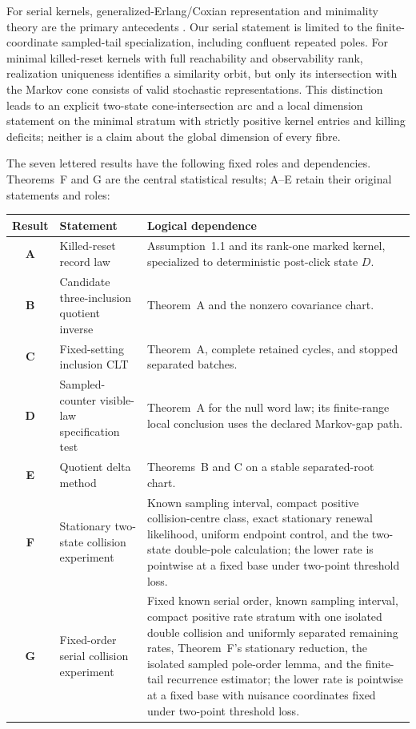 For serial kernels, generalized-Erlang/Coxian representation and minimality
theory are the primary antecedents \cite{HeZhang2008MinimalCoxian,
HeZhang2009GeneralizedErlang}.  Our serial statement is limited to the
finite-coordinate sampled-tail specialization, including confluent repeated
poles.  For minimal killed-reset kernels with full reachability and
observability rank, realization uniqueness identifies a similarity orbit, but
only its intersection with the Markov cone consists of valid stochastic
representations.  This distinction leads to an explicit
two-state cone-intersection arc and a local dimension statement on the minimal
stratum with strictly positive kernel entries and killing deficits; neither is
a claim about the global dimension of every fibre.

The seven lettered results have the following fixed roles and dependencies.
Theorems~F and G are the central statistical results; A--E retain their
original statements and roles:
\begin{center}
\begin{tabular}{>{\bfseries}c p{} p{}}
\toprule
Result & Statement & Logical dependence \\
\midrule
A & Killed-reset record law & Assumption~1.1 and its rank-one marked kernel, specialized to deterministic post-click state \(D\). \\
B & Candidate three-inclusion quotient inverse & Theorem~A and the nonzero covariance chart. \\
C & Fixed-setting inclusion CLT & Theorem~A, complete retained cycles, and stopped separated batches. \\
D & Sampled-counter visible-law specification test & Theorem~A for the null word law; its finite-range local conclusion uses the declared Markov-gap path. \\
E & Quotient delta method & Theorems~B and C on a stable separated-root chart. \\
F & Stationary two-state collision experiment & Known sampling interval, compact positive collision-centre class, exact stationary renewal likelihood, uniform endpoint control, and the two-state double-pole calculation; the lower rate is pointwise at a fixed base under two-point threshold loss. \\
G & Fixed-order serial collision experiment & Fixed known serial order, known sampling interval, compact positive rate stratum with one isolated double collision and uniformly separated remaining rates, Theorem~F's stationary reduction, the isolated sampled pole-order lemma, and the finite-tail recurrence estimator; the lower rate is pointwise at a fixed base with nuisance coordinates fixed under two-point threshold loss. \\
\bottomrule
\end{tabular}
\end{center}
